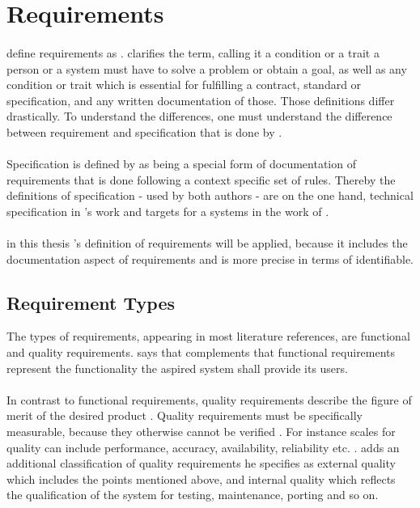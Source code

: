 \section{Requirements}
\paragraph{} \textcite[4]{Sommerville.2000} define requirements as . \textcite[13]{Pohl.2007} clarifies the term, calling it a condition or a trait a person or a system must have to solve a problem or obtain a goal, as well as any condition or trait which is essential for fulfilling a contract, standard or specification, and any written documentation of those. Those definitions differ drastically. To understand the differences, one must understand the difference between requirement and specification that is done by \citeauthor{Pohl.2007}.
\paragraph{} Specification is defined by \textcite[220]{Pohl.2007} as being a special form of documentation of requirements that is done following a context specific set of rules. Thereby the definitions of specification - used by both authors - are on the one hand, technical specification in \citeauthor{Pohl.2007}'s work and targets for a systems in the work of \citeauthor{Sommerville.2000}. 
\paragraph{} in this thesis \citeauthor{Pohl.2007}'s definition of requirements will be applied, because it includes the documentation aspect of requirements and is more precise in terms of identifiable.
\subsection{Requirement Types \label{ssec:reqTypes}}
The types of requirements, appearing in most literature references, are functional and quality requirements. \textcite[14]{Lauesen.2008} says that  \textcite[cf.][15]{Pohl.2007} complements that functional requirements represent the functionality the aspired system shall provide its users. 
\paragraph{} In contrast to functional requirements, quality requirements describe the figure of merit of the desired product \parencite[cf.][15]{Lauesen.2008}. Quality requirements must be specifically measurable, because they otherwise cannot be verified \parencite[cf.][371-371]{Lauesen.2008}. For instance scales for quality can include performance, accuracy, availability, reliability etc. \parencite[cf.][15]{Pohl.2007}. \textcite[cf.][29]{Ebert.2014} adds an additional classification of quality requirements he specifies as external quality which includes the points mentioned above, and internal quality which reflects the qualification of the system for testing, maintenance, porting and so on. 
